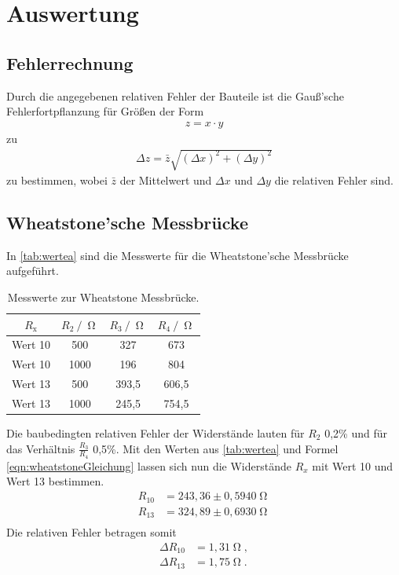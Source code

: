 \section{Auswertung}
\label{sec:Auswertung}

\subsection{Fehlerrechnung}
Durch die angegebenen relativen Fehler der Bauteile ist die Gauß'sche Fehlerfortpflanzung für Größen der Form
\begin{align*}
  z = x \cdot y    
\end{align*}
zu
\begin{align*}
  \Delta z = \bar{z}\sqrt{(\Delta x)^2 + (\Delta y)^2}    
\end{align*}
zu bestimmen, wobei $\bar{z}$ der Mittelwert und $\Delta x$ und $\Delta y$ die relativen Fehler sind.


\subsection{Wheatstone'sche Messbrücke}
In \autoref{tab:wertea} sind die Messwerte für die Wheatstone'sche Messbrücke aufgeführt.
\begin{table}[H]
  \centering
  \caption{Messwerte zur Wheatstone Messbrücke.}
  \label{tab:wertea}
  \begin{tabular}{c c c c}
    \toprule
    $R_{\text{x}}$ & $R_{\text{2}} \:/\: \upOmega$ & $R_{\text{3}} \:/\: \upOmega$ & $R_{\text{4}} \:/\: \upOmega$ \\
    \midrule
    Wert 10 & 500 & 327 & 673 \\
    Wert 10 & 1000 & 196 & 804 \\
    Wert 13 & 500 & 393,5 & 606,5 \\
    Wert 13 & 1000 & 245,5 & 754,5 \\
    \bottomrule
  \end{tabular}
\end{table}
Die baubedingten relativen Fehler der Widerstände lauten für $R_2$ 0,2\% und für das Verhältnis $\frac{R_3}{R_4}$ 0,5\%. Mit den Werten aus \autoref{tab:wertea} und
Formel \autoref{eqn:wheatstoneGleichung} lassen sich nun die Widerstände $R_x$ mit Wert 10 und Wert 13 bestimmen.
\begin{align*}
  R_{10} &= 243,36 \pm 0,5940 \upOmega \\
  R_{13} &= 324,89 \pm 0,6930 \upOmega \\
\end{align*}
Die relativen Fehler betragen somit
\begin{align*}
  \Delta R_{10} &= 1,31 \upOmega , \\
  \Delta R_{13} &= 1,75 \upOmega . \\
\end{align*}

